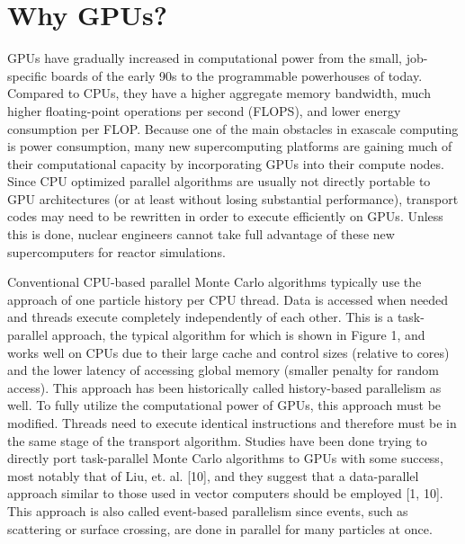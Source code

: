 \section{Why GPUs?}

GPUs have gradually increased in computational power from the small, job-specific boards of the early 90s to the programmable powerhouses of today.  Compared to CPUs, they have a higher aggregate memory bandwidth, much higher floating-point operations per second (FLOPS), and lower energy consumption per FLOP.  Because one of the main obstacles in exascale computing is power consumption, many new supercomputing platforms are gaining much of their computational capacity by incorporating GPUs into their compute nodes.  Since CPU optimized parallel algorithms are usually not directly portable to GPU architectures (or at least without losing substantial performance), transport codes may need to be rewritten in order to execute efficiently on GPUs.  Unless this is done, nuclear engineers cannot take full advantage of these new supercomputers for reactor simulations.

Conventional CPU-based parallel Monte Carlo algorithms typically use the approach of one particle history per CPU thread.  Data is accessed when needed and threads execute completely independently of each other.  This is a task-parallel approach, the typical algorithm for which is shown in Figure 1, and works well on CPUs due to their large cache and control sizes (relative to cores) and the lower latency of accessing global memory (smaller penalty for random access).  This approach has been historically called history-based parallelism as well.  To fully utilize the computational power of GPUs, this approach must be modified.  Threads need to execute identical instructions and therefore must be in the same stage of the transport algorithm.  Studies have been done trying to directly port task-parallel Monte Carlo algorithms to GPUs with some success, most notably that of Liu, et. al. [10], and they suggest that a data-parallel approach similar to those used in vector computers should be employed [1, 10].  This approach is also called event-based parallelism since events, such as scattering or surface crossing, are done in parallel for many particles at once.


